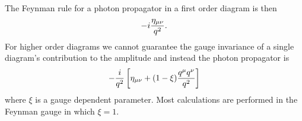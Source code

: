 The Feynman rule for a photon propagator in a first order diagram is then
\begin{equation}
    -i\frac{\eta_{\mu\nu}}{q^2}.
\end{equation}
For higher order diagrams we cannot guarantee the gauge invariance of a single diagram's contribution to the amplitude and instead the photon propagator is
\begin{equation}
    -\frac{i}{q^2}\left[ \eta_{\mu\nu} + (1 - \xi) \frac{q^\mu q^\nu}{q^2} \right]
\end{equation}
where \(\xi\) is a gauge dependent parameter.
Most calculations are performed in the Feynman gauge in which \(\xi = 1\).